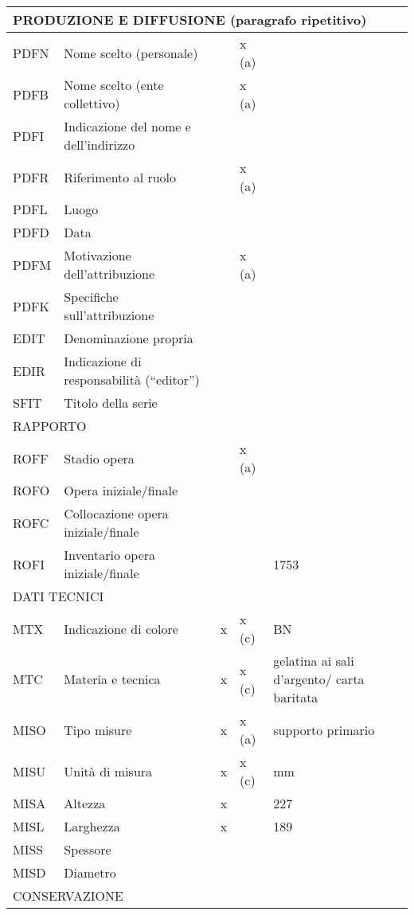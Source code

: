 \begin{center}
\begin{longtable}{ | p{1cm} | p{4cm} | p{.6cm} | p{.6cm} | p{5cm} | }
  \multicolumn{5}{|l|}{\cellcolor{lightcyan}PRODUZIONE E DIFFUSIONE (paragrafo ripetitivo)} \\ \hline
  PDFN & Nome scelto (personale) &  & x (a) &  \\ \hline
  PDFB & Nome scelto (ente collettivo) &  & x (a) &  \\ \hline
  PDFI & Indicazione del nome e dell’indirizzo &  &  &  \\ \hline
  PDFR & Riferimento al ruolo &  & x (a) &  \\ \hline
  PDFL & Luogo &  &  &  \\ \hline
  PDFD & Data &  &  &  \\ \hline
  PDFM & Motivazione dell’attribuzione &  & x (a) &  \\ \hline
  PDFK & Specifiche sull’attribuzione &  &  &  \\ \hline
  EDIT & Denominazione propria &  &  &  \\ \hline
  EDIR & Indicazione di responsabilità (“editor”) &  &  &  \\ \hline
  SFIT & Titolo della serie &  &  &  \\ \hline
  \multicolumn{5}{|l|}{\cellcolor{lightcyan}RAPPORTO} \\ \hline
  ROFF & Stadio opera &  & x (a) &  \\ \hline
  ROFO & Opera iniziale/finale &  &  &  \\ \hline
  ROFC & Collocazione opera iniziale/finale &  &  &  \\ \hline
  ROFI & Inventario opera iniziale/finale &  &  & 1753 \\ \hline
  \multicolumn{5}{|l|}{\cellcolor{lightcyan}DATI TECNICI} \\ \hline
  MTX & Indicazione di colore & x & x (c) & BN \\ \hline
  MTC & Materia e tecnica & x & x (c) & gelatina ai sali d'argento/ carta baritata \\ \hline
  MISO & Tipo misure & x & x (a) & supporto primario \\ \hline
  MISU & Unità di misura & x & x (c) & mm \\ \hline
  MISA & Altezza & x &  & 227 \\ \hline
  MISL & Larghezza & x &  & 189 \\ \hline
  MISS & Spessore &  &  &  \\ \hline
  MISD & Diametro &  &  &  \\ \hline
  \multicolumn{5}{|l|}{\cellcolor{lightcyan}CONSERVAZIONE} \\ \hline

\end{longtable}
\end{center}
